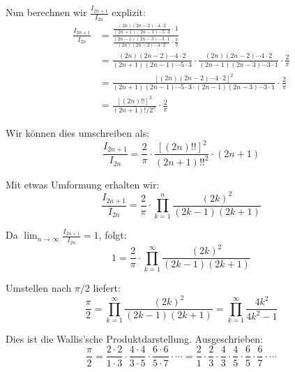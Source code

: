 \documentclass{article}
\begin{document}
Nun berechnen wir $\frac{I_{2n+1}}{I_{2n}}$ explizit:
\begin{align*}
\frac{I_{2n+1}}{I_{2n}} &= \frac{\frac{(2n)(2n-2)\cdots 4 \cdot 2}{(2n+1)(2n-1)\cdots 5 \cdot 3} \cdot 1}{\frac{(2n-1)(2n-3)\cdots 3 \cdot 1}{(2n)(2n-2)\cdots 4 \cdot 2} \cdot \frac{\pi}{2}}\\
&= \frac{(2n)(2n-2)\cdots 4 \cdot 2}{(2n+1)(2n-1)\cdots 5 \cdot 3} \cdot \frac{(2n)(2n-2)\cdots 4 \cdot 2}{(2n-1)(2n-3)\cdots 3 \cdot 1} \cdot \frac{2}{\pi}\\
&= \frac{[(2n)(2n-2)\cdots 4 \cdot 2]^2}{(2n+1)(2n-1)\cdots 5 \cdot 3 \cdot (2n-1)(2n-3)\cdots 3 \cdot 1} \cdot \frac{2}{\pi}\\
&= \frac{[(2n)!!]^2}{(2n+1)! / 2^n} \cdot \frac{2}{\pi}
\end{align*}

Wir können dies umschreiben als:
$$\frac{I_{2n+1}}{I_{2n}} = \frac{2}{\pi} \cdot \frac{[(2n)!!]^2}{(2n+1)!!^2} \cdot (2n+1)$$

Mit etwas Umformung erhalten wir:
$$\frac{I_{2n+1}}{I_{2n}} = \frac{2}{\pi} \cdot \prod_{k=1}^n \frac{(2k)^2}{(2k-1)(2k+1)}$$

Da $\lim_{n\to\infty} \frac{I_{2n+1}}{I_{2n}} = 1$, folgt:
$$1 = \frac{2}{\pi} \cdot \prod_{k=1}^\infty \frac{(2k)^2}{(2k-1)(2k+1)}$$

Umstellen nach $\pi/2$ liefert:
$$\frac{\pi}{2} = \prod_{k=1}^\infty \frac{(2k)^2}{(2k-1)(2k+1)} = \prod_{k=1}^\infty \frac{4k^2}{4k^2-1}$$

Dies ist die Wallis'sche Produktdarstellung. Ausgeschrieben:
$$\frac{\pi}{2} = \frac{2 \cdot 2}{1 \cdot 3} \cdot \frac{4 \cdot 4}{3 \cdot 5} \cdot \frac{6 \cdot 6}{5 \cdot 7} \cdot \cdots = \frac{2}{1} \cdot \frac{2}{3} \cdot \frac{4}{3} \cdot \frac{4}{5} \cdot \frac{6}{5} \cdot \frac{6}{7} \cdot \cdots$$
\end{document}
